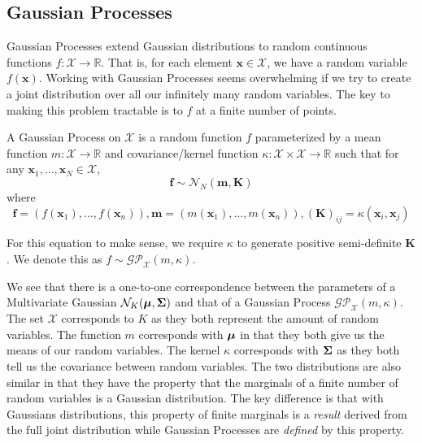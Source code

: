 \subsection{Gaussian Processes}

Gaussian Processes extend Gaussian distributions to random continuous functions $f: \mathcal{X} \to \mathbb{R}$.
That is, for each element $\mathbf{x} \in \mathcal{X}$, we have a random variable $f(\mathbf{x})$.
Working with Gaussian Processes seems overwhelming if we try to create a joint distribution over all our infinitely many random variables.
The key to making this problem tractable is to $f$ at a finite number of points.

\begin{definition}\label{def:gp}
    A Gaussian Process on $\mathcal{X}$ is a random function $f$ parameterized by a mean function
    $m: \mathcal{X} \to \mathbb{R}$ and covariance/kernel function $\kappa: \mathcal{X} \times \mathcal{X} \to \mathbb{R}$
    such that
    for any $\mathbf{x}_1, \dots,\mathbf{x}_N \in \mathcal{X}$,
    \begin{equation*}
        \mathbf{f} \sim \mathcal{N}_N\left(\mathbf{m}, \mathbf{K}\right)
    \end{equation*}
    where
    \begin{equation*}
        \mathbf{f} = (f(\mathbf{x}_1), \dots, f(\mathbf{x}_n)), \mathbf{m} = (m(\mathbf{x}_1), \dots, m(\mathbf{x}_n)), (\mathbf{K})_{ij} = \kappa(\mathbf{x}_i, \mathbf{x}_j)
    \end{equation*}

    For this equation to make sense, we require $\kappa$ to generate positive semi-definite $\mathbf{K}$.
    We denote this as $f \sim \mathcal{GP}_{\mathcal{X}}(m, \kappa)$.
\end{definition}

We see that there is a one-to-one correspondence between the parameters of a Multivariate Gaussian $\mathcal{N}_{K}(\boldsymbol{\mu}, \boldsymbol{\Sigma})$ and that of a Gaussian Process $\mathcal{GP}_{ \mathcal{X}}(m, \kappa)$.
The set $\mathcal{X}$ corresponds to $K$ as they both represent the amount of random variables.
The function $m$ corresponds with $\boldsymbol{\mu}$ in that they both give us the means of our random variables.
The kernel $\kappa$ corresponds with $\boldsymbol{\Sigma}$ as they both tell us the covariance between random variables.
The two distributions are also similar in that they have the property that the marginals of a finite number of random variables is a Gaussian distribution.
The key difference is that with Gaussians distributions, this property of finite marginals is a \emph{result} derived from the full joint distribution while Gaussian Processes are \emph{defined} by this property.

